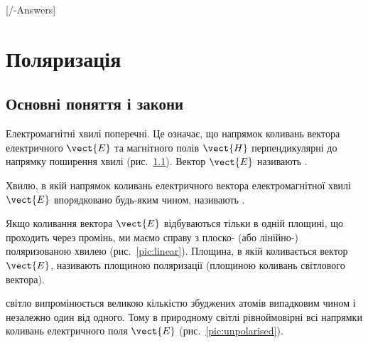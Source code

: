 
[\currfilebase/\currfilebase-Answers]
\chapter{Поляризація}\label{\currfilebase}
\makeatletter
{}
\makeatother

\let\tss\textsuperscript %

\section{Основні поняття і закони}

Електромагнітні хвилі поперечні. Це означає, що напрямок коливань вектора електричного $ \vect{E} $ та магнітного полів $ \vect{H} $ перпендикулярні до напрямку поширення хвилі (рис.~\ref{pic:EM_wave}). Вектор $ \vect{E} $ називають .


\begin{figure}[h!]\centering

\caption{}
\label{pic:EM_wave}
\end{figure}



Хвилю, в якій напрямок коливань електричного вектора електромагнітної хвилі $ \vect{E} $ впорядковано будь-яким чином, називають .

Якщо коливання вектора $ \vect{E} $ відбуваються
тільки в одній площині, що проходить через промінь, ми маємо
справу з плоско- (або лінійно-) поляризованою хвилею (рис.~\ref{pic:linear}). Площина, в якій коливається вектор $ \vect{E} $, називають площиною
поляризації (площиною коливань світлового вектора).

 світло випромінюється великою кількістю збуджених атомів  випадковим чином і незалежно один від одного. Тому в природному світлі рівноймовірні всі напрямки коливань електричного поля $ \vect{E} $ (рис.~\ref{pic:unpolarised}).

